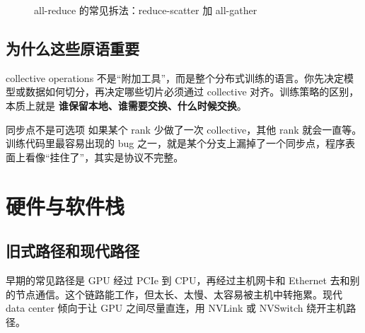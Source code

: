 \documentclass[a4paper]{article}
\begin{document}
\begin{figure}[H]
\centering
{}
\caption{all-reduce 的常见拆法：reduce-scatter 加 all-gather}
\end{figure}

\subsection{为什么这些原语重要}

collective operations 不是“附加工具”，而是整个分布式训练的语言。你先决定模型或数据如何切分，再决定哪些切片必须通过 collective 对齐。训练策略的区别，本质上就是 \textbf{谁保留本地、谁需要交换、什么时候交换}。

\begin{warningbox}{同步点不是可选项}
如果某个 rank 少做了一次 collective，其他 rank 就会一直等。训练代码里最容易出现的 bug 之一，就是某个分支上漏掉了一个同步点，程序表面上看像“挂住了”，其实是协议不完整。
\end{warningbox}

\section{硬件与软件栈}

\subsection{旧式路径和现代路径}

早期的常见路径是 GPU 经过 PCIe 到 CPU，再经过主机网卡和 Ethernet 去和别的节点通信。这个链路能工作，但太长、太慢、太容易被主机中转拖累。现代 data center 倾向于让 GPU 之间尽量直连，用 NVLink 或 NVSwitch 绕开主机路径。
\end{document}
